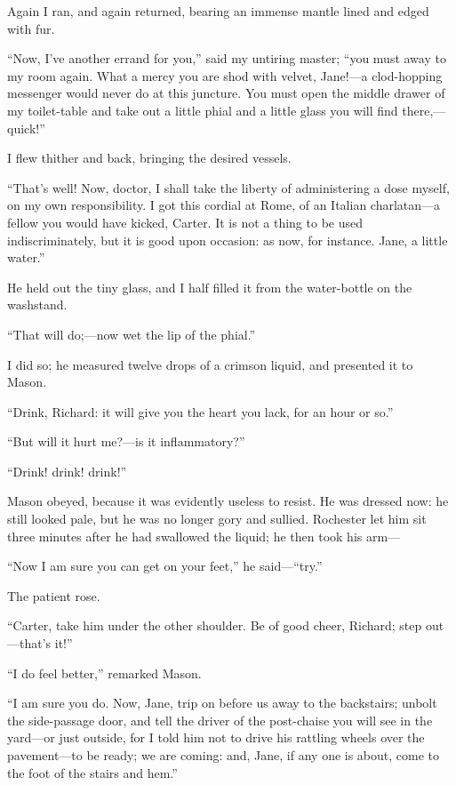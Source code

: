 Again I ran, and again returned, bearing an immense mantle lined and
edged with fur.

\enquote{Now, I've another errand for you,} said my untiring master;
\enquote{you must away to my room again. What a mercy you are shod with
	velvet, Jane!---a clod-hopping messenger would never do at this
	juncture. You must open the middle drawer of my toilet-table and take
	out a little phial and a little glass you will find there,---quick!}

I flew thither and back, bringing the desired vessels.

\enquote{That's well! Now, doctor, I shall take the liberty of
	administering a dose myself, on my own responsibility. I got this
	cordial at Rome, of an Italian charlatan---a fellow you would have
	kicked, Carter. It is not a thing to be used indiscriminately, but it
	is good upon occasion: as now, for instance. Jane, a little water.}

He held out the tiny glass, and I half filled it from the water-bottle
on the washstand.

\enquote{That will do;---now wet the lip of the phial.}

I did so; he measured twelve drops of a crimson liquid, and presented it
to Mason.

\enquote{Drink, Richard: it will give you the heart you lack, for an
	hour or so.}

\enquote{But will it hurt me?---is it inflammatory?}

\enquote{Drink! drink! drink!}

\Mr{} Mason obeyed, because it was evidently useless to resist. He was
dressed now: he still looked pale, but he was no longer gory and
sullied. \Mr{} Rochester let him sit three minutes after he had swallowed
the liquid; he then took his arm---

\enquote{Now I am sure you can get on your feet,} he
said---\enquote{try.}

The patient rose.

\enquote{Carter, take him under the other shoulder. Be of good cheer,
	Richard; step out---that's it!}

\enquote{I do feel better,} remarked \Mr{} Mason.

\enquote{I am sure you do. Now, Jane, trip on before us away to the
	backstairs; unbolt the side-passage door, and tell the driver of the
	post-chaise you will see in the yard---or just outside, for I told him
	not to drive his rattling wheels over the pavement---to be ready; we are
	coming: and, Jane, if any one is about, come to the foot of the stairs
	and hem.}


